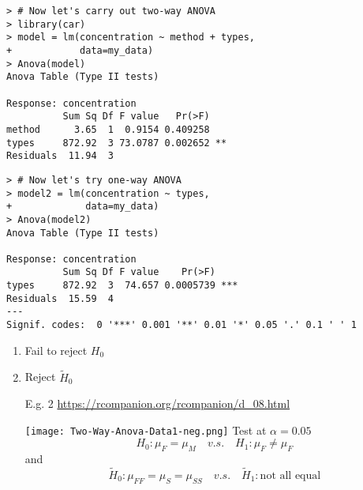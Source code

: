 \begin{frame}[fragile]
	\begin{center}
		\begin{minipage}{0.47\textwidth}
	\begin{lstlisting}
> # Now let's carry out two-way ANOVA
> library(car)
> model = lm(concentration ~ method + types,
+            data=my_data)
> Anova(model)
Anova Table (Type II tests)

Response: concentration
          Sum Sq Df F value   Pr(>F)
method      3.65  1  0.9154 0.409258
types     872.92  3 73.0787 0.002652 **
Residuals  11.94  3
	\end{lstlisting}
		\end{minipage}
		\hfill
		\begin{minipage}{0.48\textwidth}
	\begin{lstlisting}
> # Now let's try one-way ANOVA
> model2 = lm(concentration ~ types,
+             data=my_data)
> Anova(model2)
Anova Table (Type II tests)

Response: concentration
          Sum Sq Df F value    Pr(>F)
types     872.92  3  74.657 0.0005739 ***
Residuals  15.59  4
---
Signif. codes:  0 '***' 0.001 '**' 0.01 '*' 0.05 '.' 0.1 ' ' 1
	\end{lstlisting}
		\end{minipage}
	\end{center}

\vfill
	\begin{enumerate}
		\item Fail to reject $H_0$
		\item Reject $\widetilde H_0$
	\end{enumerate}
\end{frame}
\begin{frame}[fragile]

	\begin{enumerate}
		\item[E.g. 2]{\url{https://rcompanion.org/rcompanion/d_08.html}}
			\begin{center}
				\texttt{[image: Two-Way-Anova-Data1-neg.png]}
				\vfill
				Test at $\alpha=0.05$\\
				\[
				H_0: \mu_F = \mu_M \quad v.s.\quad
				H_1: \mu_F\ne \mu_F
				\]
				and
				\[
					\widetilde H_0: \mu_{FF} = \mu_{S}= \mu_{SS} \quad v.s. \quad \widetilde H_1: \text{not all equal}
				\]
			\end{center}
	\end{enumerate}
\end{frame}
